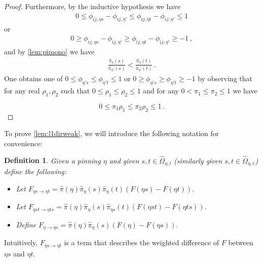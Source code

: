 \documentclass[a4paper, 12p]{article}
\numberwithin{equation}{section}
\newcommand{\FF}{F}
\newcommand{\Omorproj}{\hat{\Omega}}
\newcommand{\piorproj}{\hat{\pi}}
\newcommand{\flo}[2]{F_{#1 \rightarrow #2}}
\newtheorem{definition}[theorem]{Definition}
\begin{document}
\begin{proof}
Furthermore, by the inductive hypothesis we have
\begin{align}
    0 \leq \phi_{ij,\eta s} - \phi_{ij,\eta'} \leq \phi_{ij,\eta t} - \phi_{ij,\eta'} \leq 1
\end{align}
or
\begin{align}
    0 \geq \phi_{ij,\eta s} - \phi_{ij,\eta'} \geq \phi_{ij,\eta t} - \phi_{ij,\eta'} \geq -1\,,
\end{align}
and by \cref{lem:pimono} we have
\begin{align}
    \frac{\piorproj_{\eta}(s)}{\piorproj_{\eta'}(s)} < \frac{\piorproj_{\eta}(t)}{\piorproj_{\eta'}(t)}\,.
\end{align}
One obtains one of $0 \leq \phi_{\eta' s} \leq \phi_{\eta' t} \leq 1$ or $0 \geq \phi_{\eta' s} \geq \phi_{\eta' t} \geq -1$ by observing that for any real $\rho_1, \rho_2$ such that $0 \leq \rho_1 \leq \rho_2 \leq 1$ and for any $0 < \pi_1 \leq \pi_2 \leq 1$  we have

\[
  0 \leq \pi_1 \rho_1 \leq \pi_2 \rho_2 \leq 1\,.
\]

\end{proof}

To prove \cref{lem:l1dirweak}, we will introduce the following notation for convenience:

\begin{definition}
    Given a pinning $\eta$ and given $s, t \in \Omorproj_{\eta, l}$ (similarly given $s, t \in \Omorproj_{\eta, r}$) define the following:

    \begin{itemize}
        \item     Let $\flo{\eta s}{\eta t} = \piorproj(\eta)\piorproj_{\eta}(s)\piorproj_{\eta}(t)(\FF(\eta s) - \FF(\eta t))$.
        \item Let $\flo{\eta s t}{\eta t s} = \piorproj(\eta)\piorproj_{\eta}(s)\piorproj_{\eta s}(t)(\FF(\eta s t) - \FF(\eta t s))$.
        \item Define $\flo{\eta}{\eta s} = \piorproj(\eta)\piorproj_{\eta}(s)(\FF(\eta) - \FF(\eta s))$.
    \end{itemize}
\end{definition}

Intuitively, $\flo{\eta s}{\eta t}$ is a term that describes the weighted difference of $\FF$ between $\eta s$ and $\eta t$.
\end{document}
